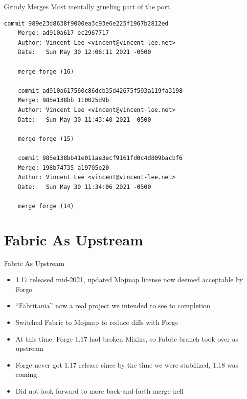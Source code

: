 \documentclass{beamer}
\begin{document}
\begin{frame}[fragile]{Grindy Merges}
  Most mentally grueling part of the port
  
  \begin{lstlisting}[basicstyle=\tiny\ttfamily]
    commit 989e23d8638f9000ea3c93e6e225f1967b2812ed
    Merge: ad910a617 ec2967717
    Author: Vincent Lee <vincent@vincent-lee.net>
    Date:   Sun May 30 12:06:11 2021 -0500

    merge forge (16)

    commit ad910a617560c86dcb35d42675f593a119fa3198
    Merge: 985e138bb 110025d9b
    Author: Vincent Lee <vincent@vincent-lee.net>
    Date:   Sun May 30 11:43:40 2021 -0500

    merge forge (15)

    commit 985e138bb41e011ae3ecf9161fd0c4d809bacbf6
    Merge: 198b74735 a19705e20
    Author: Vincent Lee <vincent@vincent-lee.net>
    Date:   Sun May 30 11:34:06 2021 -0500

    merge forge (14)
  \end{lstlisting}
\end{frame}

\section{Fabric As Upstream}
\begin{frame}{Fabric As Upstream}
  \begin{itemize}
  \item 1.17 released mid-2021, updated Mojmap license now deemed acceptable by Forge
  \item ``Fabritania'' now a real project we intended to see to completion
  \item Switched Fabric to Mojmap to reduce diffs with Forge
  \item At this time, Forge 1.17 had broken Mixins, so Fabric branch took over as upstream
  \item Forge never got 1.17 release since by the time we were stabilized, 1.18 was coming
  \item Did not look forward to more back-and-forth merge-hell
  \end{itemize}
\end{frame}
\end{document}
